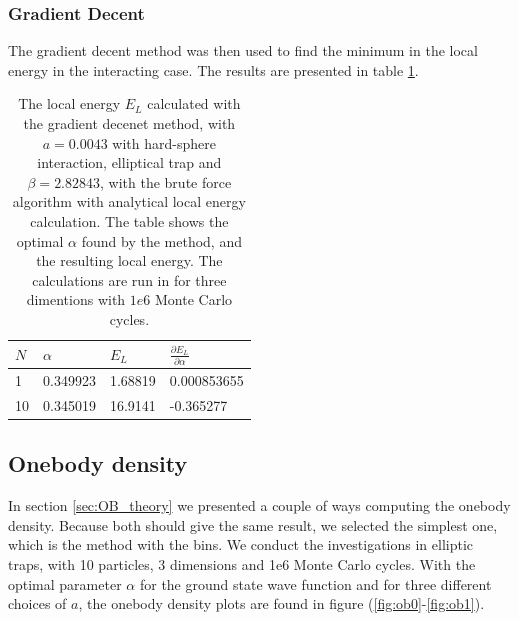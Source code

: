 \documentclass[norsk,a4paper,12pt]{article}
\begin{document}
\subsubsection{Gradient Decent}
The gradient decent method was then used to find the minimum in the local energy in the interacting case. The results are presented in table \ref{tab:EL_calc_gradientdecent}.

\begin{table} [H]
	\centering
	\caption{The local energy $E_L$ calculated with the gradient decenet method, with $a=0.0043$  with hard-sphere interaction,  elliptical trap and $\beta=2.82843$, with the brute force algorithm with analytical local energy calculation. The table shows the optimal $\alpha$ found by the method, and the resulting local energy. The calculations are run in for  three dimentions with $1e6$ Monte Carlo cycles.}
	\begin{tabularx}{\textwidth}{X|XXX} \hline
		\label{tab:EL_calc_gradientdecent}
		$N$ & $\alpha $ & $E_L$  & $\frac{\partial E_L}{\partial \alpha}$   \\ \hline
		1 & 0.349923 & 1.68819 & 0.000853655 \\
		10 &0.345019 & 16.9141 & -0.365277 \\ \hline
	\end{tabularx}
\end{table}



\subsection{Onebody density}
In section \ref{sec:OB_theory} we presented a couple of ways computing the onebody density. Because both should give the same result, we selected the simplest one, which is the method with the bins. We conduct the investigations in elliptic traps, with 10 particles, 3 dimensions and 1e6 Monte Carlo cycles. With the optimal parameter $\alpha$ for the ground state wave function and for three different choices of $a$, the onebody density plots are found in figure (\ref{fig:ob0}-\ref{fig:ob1}).
\end{document}
